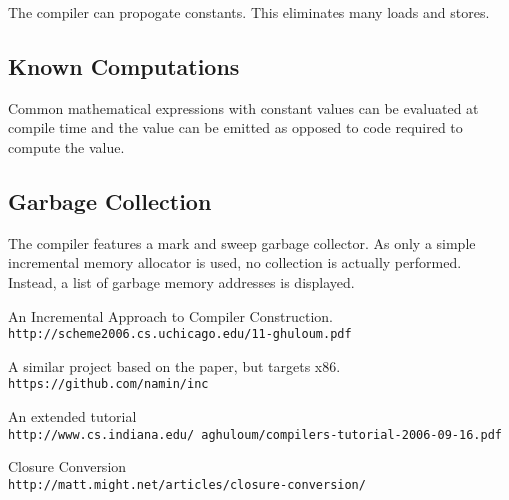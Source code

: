 \documentclass{article}
\begin{document}
The compiler can propogate constants. This eliminates many loads and stores. 

\subsection{Known Computations}

Common mathematical expressions with constant values can be evaluated at compile time and the value can be emitted as opposed to code required to compute the value.

\subsection{Garbage Collection}

The compiler features a mark and sweep garbage collector. As only a simple incremental memory allocator is used, no collection is actually performed. Instead, a list of garbage memory addresses is displayed. 

\begin{thebibliography}{5}

An Incremental Approach to Compiler Construction.
\\\texttt{http://scheme2006.cs.uchicago.edu/11-ghuloum.pdf}

A similar project based on the paper, but targets x86.
\\\texttt{https://github.com/namin/inc}

An extended tutorial 
\\\texttt{http://www.cs.indiana.edu/~aghuloum/compilers-tutorial-2006-09-16.pdf}

Closure Conversion
\\\texttt{http://matt.might.net/articles/closure-conversion/}


\end{thebibliography}  
\end{document}
